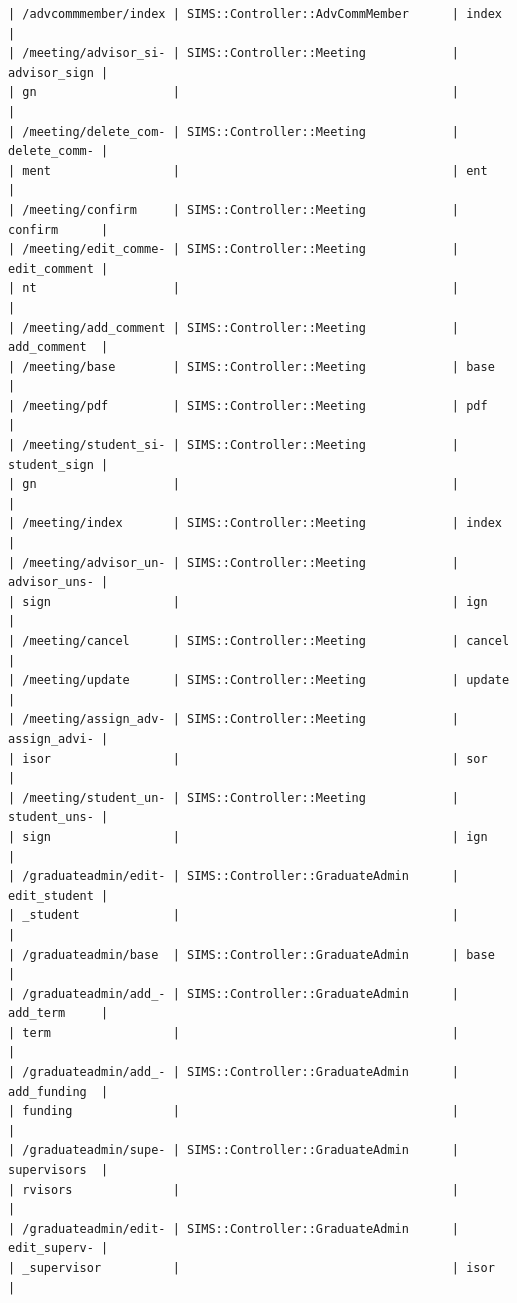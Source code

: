 \documentclass{journal}
\begin{document}
\begin{verbatim}
| /advcommmember/index | SIMS::Controller::AdvCommMember      | index        |
| /meeting/advisor_si- | SIMS::Controller::Meeting            | advisor_sign |
| gn                   |                                      |              |
| /meeting/delete_com- | SIMS::Controller::Meeting            | delete_comm- |
| ment                 |                                      | ent          |
| /meeting/confirm     | SIMS::Controller::Meeting            | confirm      |
| /meeting/edit_comme- | SIMS::Controller::Meeting            | edit_comment |
| nt                   |                                      |              |
| /meeting/add_comment | SIMS::Controller::Meeting            | add_comment  |
| /meeting/base        | SIMS::Controller::Meeting            | base         |
| /meeting/pdf         | SIMS::Controller::Meeting            | pdf          |
| /meeting/student_si- | SIMS::Controller::Meeting            | student_sign |
| gn                   |                                      |              |
| /meeting/index       | SIMS::Controller::Meeting            | index        |
| /meeting/advisor_un- | SIMS::Controller::Meeting            | advisor_uns- |
| sign                 |                                      | ign          |
| /meeting/cancel      | SIMS::Controller::Meeting            | cancel       |
| /meeting/update      | SIMS::Controller::Meeting            | update       |
| /meeting/assign_adv- | SIMS::Controller::Meeting            | assign_advi- |
| isor                 |                                      | sor          |
| /meeting/student_un- | SIMS::Controller::Meeting            | student_uns- |
| sign                 |                                      | ign          |
| /graduateadmin/edit- | SIMS::Controller::GraduateAdmin      | edit_student |
| _student             |                                      |              |
| /graduateadmin/base  | SIMS::Controller::GraduateAdmin      | base         |
| /graduateadmin/add_- | SIMS::Controller::GraduateAdmin      | add_term     |
| term                 |                                      |              |
| /graduateadmin/add_- | SIMS::Controller::GraduateAdmin      | add_funding  |
| funding              |                                      |              |
| /graduateadmin/supe- | SIMS::Controller::GraduateAdmin      | supervisors  |
| rvisors              |                                      |              |
| /graduateadmin/edit- | SIMS::Controller::GraduateAdmin      | edit_superv- |
| _supervisor          |                                      | isor         |

\end{verbatim}
\end{document}
